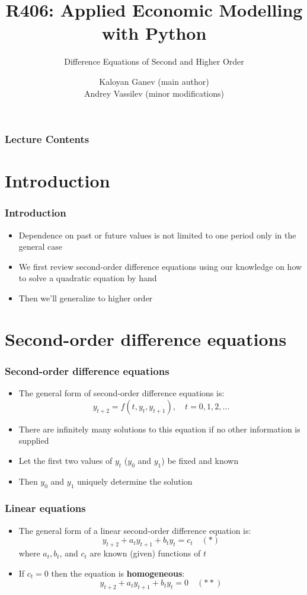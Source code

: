 \documentclass[10pt,usenames,dvipsnames]{beamer}
\title{R406: Applied Economic Modelling with Python}
\subtitle{\textcolor{myred}{Difference Equations of Second and Higher Order}}
\author[Kaloyan Ganev,  Andrey Vassilev]{Kaloyan Ganev (main author) \\
	Andrey Vassilev (minor modifications)}
\date{}
\theoremstyle{definition}
\begin{document}
\maketitle

\begin{frame}[fragile]
\frametitle{Lecture Contents}
\tableofcontents
\end{frame}

\section{Introduction}
\begin{frame}[fragile]
\frametitle{Introduction}
\begin{itemize}
	\item Dependence on past or future values is not limited to one period only in the general case
	\item We first review second-order difference equations using our knowledge on how to solve a quadratic equation by hand
	\item Then we'll generalize to higher order
\end{itemize}
\end{frame}

\section{Second-order difference equations}
\begin{frame}[fragile]
\frametitle{Second-order difference equations}
\begin{itemize}
	\item The general form of second-order difference equations is:
	\[
		y_{t+2} = f(t, y_{t}, y_{t+1}),\quad t = 0,1,2,\ldots
	\]
	\item There are infinitely many solutions to this equation if no other information is supplied
	\item Let the first two values of $y_{t}$ ($y_{0}$ and $y_{1}$) be fixed and known
	\item Then $y_{0}$ and $y_{1}$ uniquely determine the solution
\end{itemize}
\end{frame}

\begin{frame}[fragile]
\frametitle{Linear equations}
\begin{itemize}
	\item The general form of a linear second-order difference equation is:
	\[
		y_{t+2} + a_{t}y_{t+1} + b_{t}y_{t} = c_{t} \quad (*)
	\]
	where $a_{t},b_{t}$, and $c_{t}$ are known (given) functions of $t$
	\item If $c_{t} = 0$ then the equation is \textbf{homogeneous}:
	\[
		y_{t+2} + a_{t}y_{t+1} + b_{t}y_{t} = 0 \quad (**)
	\]
\end{itemize}
\end{frame}
\end{document}
